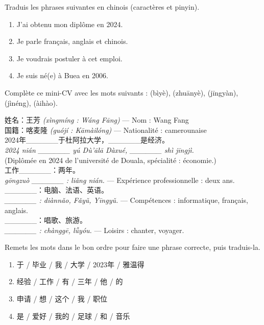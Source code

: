 \documentclass[11pt]{article}
\newcommand{\zh}[1]{\ifmmode\text{#1}\else{#1}\fi}
\begin{document}
\begin{exercice}
Traduis les phrases suivantes en chinois (caractères et pinyin).
\begin{enumerate}
\item J'ai obtenu mon diplôme en 2024.
\item Je parle français, anglais et chinois.
\item Je voudrais postuler à cet emploi.
\item Je suis né(e) à Buea en 2006.
\end{enumerate}
\end{exercice}

\begin{exercice}[CV à trous]
Complète ce mini-CV avec les mots suivants : \zh{毕业} (bìyè), \zh{专业} (zhuānyè), \zh{经验} (jīngyàn), \zh{技能} (jìnéng), \zh{爱好} (àihào).
\begin{textebox}[Un CV à compléter]
姓名：王芳 \emph{(xìngmíng : Wáng Fāng)} — Nom : Wang Fang\\
国籍：喀麦隆 \emph{(guójí : Kāmàilóng)} — Nationalité : camerounaise\\
2024年\_\_\_\_\_\_于杜阿拉大学，\_\_\_\_\_\_是经济。\\
\emph{2024 nián \_\_\_\_\_\_ yú Dù'ālā Dàxué, \_\_\_\_\_\_ shì jīngjì.}\\
(Diplômée en 2024 de l'université de Douala, spécialité : économie.)\\
工作\_\_\_\_\_\_：两年。\\
\emph{gōngzuò \_\_\_\_\_\_ : liǎng nián.} — Expérience professionnelle : deux ans.\\
\_\_\_\_\_\_：电脑、法语、英语。\\
\emph{\_\_\_\_\_\_ : diànnǎo, Fǎyǔ, Yīngyǔ.} — Compétences : informatique, français, anglais.\\
\_\_\_\_\_\_：唱歌、旅游。\\
\emph{\_\_\_\_\_\_ : chànggē, lǚyóu.} — Loisirs : chanter, voyager.
\end{textebox}
\end{exercice}

\begin{exercice}
Remets les mots dans le bon ordre pour faire une phrase correcte, puis traduis-la.
\begin{enumerate}
\item 于 / 毕业 / 我 / 大学 / 2023年 / 雅温得
\item 经验 / 工作 / 有 / 三年 / 他 / 的
\item 申请 / 想 / 这个 / 我 / 职位
\item 是 / 爱好 / 我的 / 足球 / 和 / 音乐
\end{enumerate}
\end{exercice}
\end{document}
